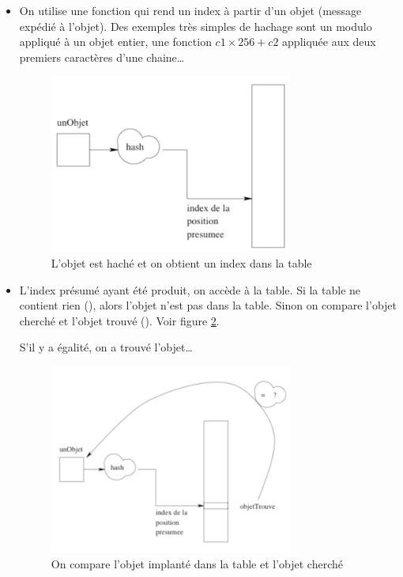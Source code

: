 \begin{itemize} 
\item On utilise une fonction qui rend un index \`a partir d'un objet
(message  exp\'edi\'e \`a l'objet). Des exemples tr\`es
simples de hachage sont un modulo appliqu\'e \`a un objet entier,
une fonction $ c1 \times 256 + c2$ appliqu\'ee aux deux premiers
caract\`eres d'une chaine\ldots 

\begin{figure}[hbtp]
\begin{center}
\leavevmode
\includegraphics[width=8cm]{hash1}
\caption{L'objet est hach\'e et on obtient un index dans la table}
\label{fig:hash1}
\end{center}
\end{figure}

\item L'index pr\'esum\'e ayant \'et\'e produit, on acc\`ede \`a la table.
Si la table ne contient rien (), alors l'objet n'est pas dans la table.
Sinon on compare l'objet cherch\'e et l'objet trouv\'e ().
Voir figure \ref{fig:hash2}.

S'il y a \'egalit\'e, on a trouv\'e l'objet\ldots

\begin{figure}[hbtp]
\begin{center} 
\includegraphics[width=8cm]{hash2} 
\caption{On compare l'objet implant\'e dans la table et l'objet cherch\'e}
\label{fig:hash2}
\end{center} 
\end{figure} 
\newpage


\end{itemize}
